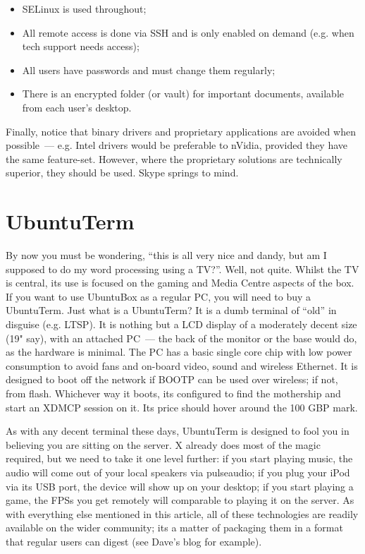\documentclass{memoir}
\begin{document}
\begin{itemize}
\item SELinux is used throughout;
\item All remote access is done via SSH and is only enabled on demand
  (e.g. when tech support needs access);
\item All users have passwords and must change them regularly;
\item There is an encrypted folder (or vault) for important documents,
  available from each user's desktop.
\end{itemize}

Finally, notice that binary drivers and proprietary applications are
avoided when possible~--- e.g. Intel drivers would be preferable to
nVidia, provided they have the same feature-set. However, where the
proprietary solutions are technically superior, they should be
used. Skype springs to mind.

\section{UbuntuTerm}

By now you must be wondering, ``this is all very nice and dandy, but
am I supposed to do my word processing using a TV?''. Well, not
quite. Whilst the TV is central, its use is focused on the gaming and
Media Centre aspects of the box. If you want to use UbuntuBox as a
regular PC, you will need to buy a UbuntuTerm. Just what is a
UbuntuTerm? It is a dumb terminal of ``old'' in disguise
(e.g. LTSP). It is nothing but a LCD display of a moderately decent
size (19" say), with an attached PC~--- the back of the monitor or the
base would do, as the hardware is minimal. The PC has a basic single
core chip with low power consumption to avoid fans and on-board video,
sound and wireless Ethernet. It is designed to boot off the network if
BOOTP can be used over wireless; if not, from flash. Whichever way it
boots, its configured to find the mothership and start an XDMCP
session on it. Its price should hover around the 100 GBP mark.

As with any decent terminal these days, UbuntuTerm is designed to fool
you in believing you are sitting on the server. X already does most of
the magic required, but we need to take it one level further: if you
start playing music, the audio will come out of your local speakers
via pulseaudio; if you plug your iPod via its USB port, the device
will show up on your desktop; if you start playing a game, the FPSs
you get remotely will comparable to playing it on the server. As with
everything else mentioned in this article, all of these technologies
are readily available on the wider community; its a matter of
packaging them in a format that regular users can digest (see Dave's
blog for example).
\end{document}
